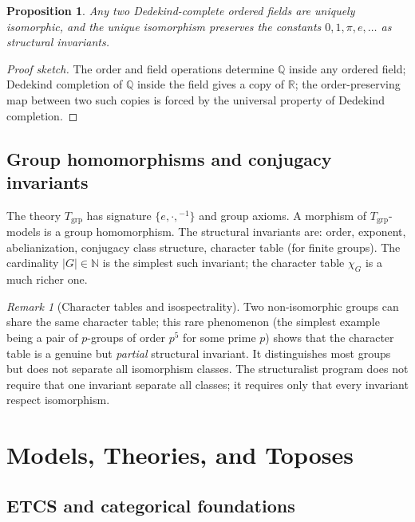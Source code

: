 \documentclass[12pt]{article}
\newtheorem{proposition}[theorem]{Proposition}
\theoremstyle{definition}
\theoremstyle{remark}
\newtheorem{remark}[theorem]{Remark}
\newcommand{\NN}{\mathbb{N}}
\newcommand{\QQ}{\mathbb{Q}}
\newcommand{\RR}{\mathbb{R}}
\begin{document}
\begin{proposition}\label{prop:R-uniqueness}
Any two Dedekind-complete ordered fields are uniquely isomorphic, and the unique isomorphism preserves the constants $0, 1, \pi, e, \dots$ as structural invariants.
\end{proposition}

\begin{proof}[Proof sketch]
The order and field operations determine $\QQ$ inside any ordered field; Dedekind completion of $\QQ$ inside the field gives a copy of $\RR$; the order-preserving map between two such copies is forced by the universal property of Dedekind completion.
\end{proof}

\subsection{Group homomorphisms and conjugacy invariants}

The theory $T_{\mathrm{grp}}$ has signature $\{e, \cdot, {}^{-1}\}$ and group axioms. A morphism of $T_{\mathrm{grp}}$-models is a group homomorphism. The structural invariants are: order, exponent, abelianization, conjugacy class structure, character table (for finite groups). The cardinality $|G| \in \NN$ is the simplest such invariant; the character table $\chi_G$ is a much richer one.

\begin{remark}[Character tables and isospectrality]
Two non-isomorphic groups can share the same character table; this rare phenomenon (the simplest example being a pair of $p$-groups of order $p^5$ for some prime $p$) shows that the character table is a genuine but \emph{partial} structural invariant. It distinguishes most groups but does not separate all isomorphism classes. The structuralist program does not require that one invariant separate all classes; it requires only that every invariant respect isomorphism.
\end{remark}

\section{Models, Theories, and Toposes}\label{sec:topos}

\subsection{ETCS and categorical foundations}
\end{document}
